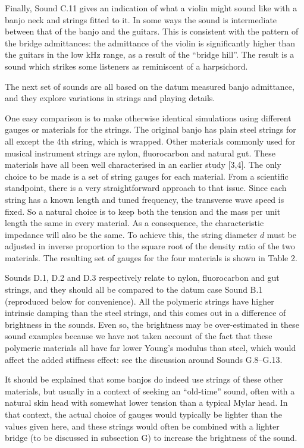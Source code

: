   Finally, Sound C.11 gives an indication of what a violin might sound like 
  with a banjo neck and strings fitted to it. In some ways the sound is 
  intermediate between that of the banjo and the guitars. This is consistent 
  with the pattern of the bridge admittances: the admittance of the violin is 
  significantly higher than the guitars in the low kHz range, as a result of 
  the ``bridge hill''. The result is a sound which strikes some listeners as 
  reminiscent of a harpsichord. 


  The next set of sounds are all based on the datum measured banjo admittance, 
  and they explore variations in strings and playing details. 

  One easy comparison is to make otherwise identical simulations using 
  different gauges or materials for the strings. The original banjo has plain 
  steel strings for all except the 4th string, which is wrapped. Other 
  materials commonly used for musical instrument strings are nylon, 
  fluorocarbon and natural gut. These materials have all been well 
  characterised in an earlier study [3,4]. The only choice to be made is a set 
  of string gauges for each material. From a scientific standpoint, there is a 
  very straightforward approach to that issue. Since each string has a known 
  length and tuned frequency, the transverse wave speed is fixed. So a natural 
  choice is to keep both the tension and the mass per unit length the same in 
  every material. As a consequence, the characteristic impedance will also be 
  the same. To achieve this, the string diameter $d$ must be adjusted in 
  inverse proportion to the square root of the density ratio of the two 
  materials. The resulting set of gauges for the four materials is shown in 
  Table 2. 

  Sounds D.1, D.2 and D.3 respectively relate to nylon, fluorocarbon and gut 
  strings, and they should all be compared to the datum case Sound B.1 
  (reproduced below for convenience). All the polymeric strings have higher 
  intrinsic damping than the steel strings, and this comes out in a difference 
  of brightness in the sounds. Even so, the brightness may be over-estimated in 
  these sound examples because we have not taken account of the fact that these 
  polymeric materials all have far lower Young's modulus than steel, which 
  would affect the added stiffness effect: see the discussion around Sounds 
  G.8--G.13. 

  It should be explained that some banjos do indeed use strings of these other 
  materials, but usually in a context of seeking an ``old-time'' sound, often 
  with a natural skin head with somewhat lower tension than a typical Mylar 
  head. In that context, the actual choice of gauges would typically be lighter 
  than the values given here, and these strings would often be combined with a 
  lighter bridge (to be discussed in subsection G) to increase the brightness 
  of the sound. 

